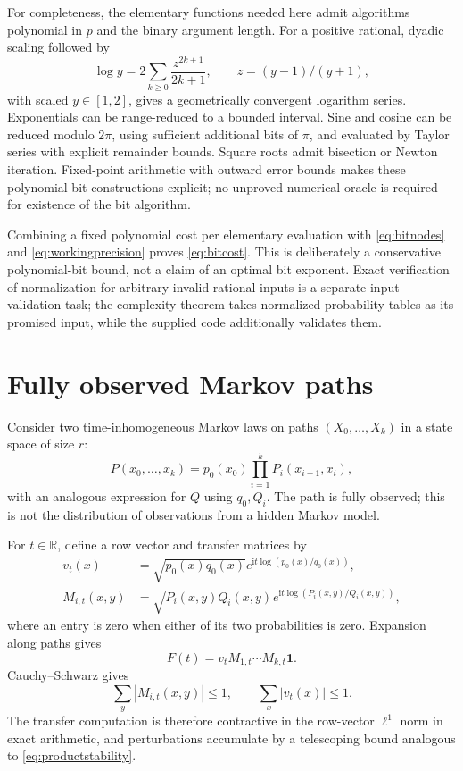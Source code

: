 \documentclass[11pt]{article}
\theoremstyle{definition}
\theoremstyle{remark}
\newcommand{\ii}{\mathrm i}
\newcommand{\R}{\mathbb R}
\begin{document}
For completeness, the elementary functions needed here admit algorithms polynomial in $p$ and the binary argument length. For a positive rational, dyadic scaling followed by
\[
 \log y=2\sum_{k\ge0}\frac{z^{2k+1}}{2k+1},
 \qquad z=(y-1)/(y+1),
\]
with scaled $y\in[1,2]$, gives a geometrically convergent logarithm series. Exponentials can be range-reduced to a bounded interval. Sine and cosine can be reduced modulo $2\pi$, using sufficient additional bits of $\pi$, and evaluated by Taylor series with explicit remainder bounds. Square roots admit bisection or Newton iteration. Fixed-point arithmetic with outward error bounds makes these polynomial-bit constructions explicit; no unproved numerical oracle is required for existence of the bit algorithm.

Combining a fixed polynomial cost per elementary evaluation with \eqref{eq:bitnodes} and \eqref{eq:workingprecision} proves \eqref{eq:bitcost}. This is deliberately a conservative polynomial-bit bound, not a claim of an optimal bit exponent. Exact verification of normalization for arbitrary invalid rational inputs is a separate input-validation task; the complexity theorem takes normalized probability tables as its promised input, while the supplied code additionally validates them.

\section{Fully observed Markov paths}
\label{sec:markov}

Consider two time-inhomogeneous Markov laws on paths $(X_0,\ldots,X_k)$ in a state space of size $r$:
\[
 P(x_0,\ldots,x_k)=p_0(x_0)\prod_{i=1}^kP_i(x_{i-1},x_i),
\]
with an analogous expression for $Q$ using $q_0,Q_i$. The path is fully observed; this is not the distribution of observations from a hidden Markov model.

For $t\in\R$, define a row vector and transfer matrices by
\begin{align}
 v_t(x)&=\sqrt{p_0(x)q_0(x)}
        e^{\ii t\log(p_0(x)/q_0(x))},\\
 M_{i,t}(x,y)&=\sqrt{P_i(x,y)Q_i(x,y)}
        e^{\ii t\log(P_i(x,y)/Q_i(x,y))},
 \label{eq:markovmat}
\end{align}
where an entry is zero when either of its two probabilities is zero. Expansion along paths gives
\begin{equation}
 F(t)=v_t M_{1,t}\cdots M_{k,t}\mathbf1.
 \label{eq:markovfactor}
\end{equation}
Cauchy--Schwarz gives
\begin{equation}
 \sum_y|M_{i,t}(x,y)|\le1,\qquad \sum_x|v_t(x)|\le1.
 \label{eq:substochastic}
\end{equation}
The transfer computation is therefore contractive in the row-vector $\ell^1$ norm in exact arithmetic, and perturbations accumulate by a telescoping bound analogous to \eqref{eq:productstability}.
\end{document}
